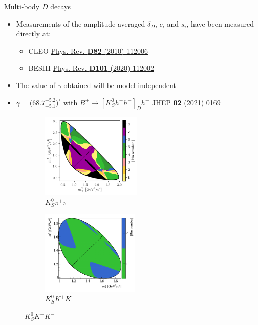 \documentclass{beamer}
\begin{document}
\begin{frame}{Multi-body $D$ decays}
  \begin{itemize}
    \setlength\itemsep{0.5em}
    \item{Measurements of the amplitude-averaged $\delta_D$, $c_i$ and $s_i$, have been measured directly at:}
    \begin{itemize}
      \item{CLEO \href{https://doi.org/10.1103/PhysRevD.82.112006}{Phys. Rev. \textbf{D82} (2010) 112006}}
      \item{BESIII \href{https://journals.aps.org/prd/abstract/10.1103/PhysRevD.101.112002}{Phys. Rev. \textbf{D101} (2020) 112002}}
    \end{itemize}
    \item{The value of $\gamma$ obtained will be \underline{model independent}}
    \item{$\gamma = \big(68.7^{+5.2}_{-5.1}\big)^\circ$ with $B^\pm\to[K^0_Sh^+h^-]_Dh^\pm$ \href{https://link.springer.com/article/10.1007/JHEP02(2021)169}{JHEP \textbf{02} (2021) 0169}}
  \end{itemize}
  \begin{figure}
    \begin{subfigure}{0.45\textwidth}
      \includegraphics[height = 4.0cm]{Plots/KsPiPi_optimal.png}
      \vspace{-0.3cm}
      \caption*{$K_S^0\pi^+\pi^-$}
    \end{subfigure}%
    \begin{subfigure}{0.45\textwidth}
      \includegraphics[height = 4.0cm]{Plots/KsKK_binning.png}
      \vspace{-0.3cm}
      \caption*{$K_S^0K^+K^-$}
    \end{subfigure}
  \end{figure}
\end{frame}
\end{document}
